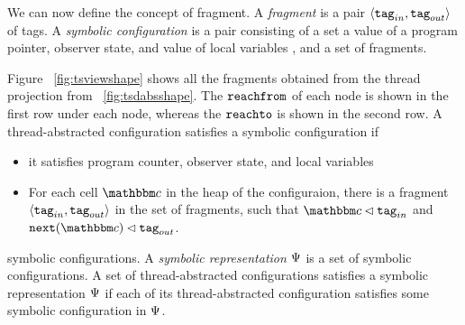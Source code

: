 We can now define the concept of fragment.
A {\em fragment} is a pair $\left\langle\mathtt{tag}_{in},\mathtt{tag}_{out}\right\rangle$ of tags.
A {\em symbolic configuration} is a pair consisting of a set a value of a program
pointer, observer state, and value of local variables , and a set of fragments.

Figure ~\ref{fig:tsviewshape} shows all the fragments obtained from the thread projection from ~\ref{fig:tsdabsshape}. The $\mathtt{reachfrom}$ of each node is shown in the first row under each node, whereas the $\mathtt{reachto}$ is shown in the second row.  
A thread-abstracted configuration satisfies a symbolic configuration if
\begin{itemize}
\item it satisfies program counter, observer state, and local variables %
\item
  For each cell $\cell$ in the heap of the configuraion, there is
  a fragment $\left\langle\mathtt{tag}_{in},\mathtt{tag}_{out}\right\rangle$ in the set of fragments, such
  that $\cell \lhd \inputtag$ and ${\tt next}(\cell) \lhd \outputtag$.
\end{itemize}

symbolic configurations. 
A {\em symbolic representation} $\Psi$ is a set of
symbolic configurations. 
A  set of thread-abstracted configurations satisfies a symbolic
representation $\Psi$ if each of its thread-abstracted
configuration satisfies some symbolic configuration in $\Psi$.





